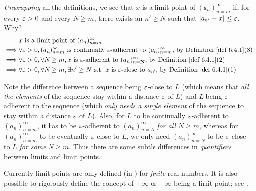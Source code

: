 \begin{additional corollary} \label{ac 6.4.1}
\emph{Unwrapping} all the definitions, we see that \(x\) is a limit point of \((a_n)_{n = m}^{\infty}\) if, for every \(\varepsilon > 0\) and every \(N \ge m\), there exists an \(n' \ge N\) such that \(\lvert a_{n'} - x\rvert \le \varepsilon\).
Why?
\begin{align*}
             & x \text{ is a limit point of } (a_n)_{n = m}^{\infty} \\
    \implies & \forall \varE > 0, (a_n)_{n = m}^{\infty} \text{ is continually } \varE \text{-adherent to } (a_n)_{n = m}^{\infty} \text{, by \DEF{6.4.1}(3)} \\
    \implies & \forall \varE > 0, \forall N \ge m, x \text{ is \(\varE\)-adherent to } (a_n)_{n = \textbf{N}}^{\infty} \text{, by \DEF{6.4.1}(2)} \\
    \implies & \forall \varE > 0, \forall N \ge m, \exists n' \ge N \text{ s.t. } x \text{ is \(\varE\)-close to \(a_{n'}\), by \DEF{6.4.1}(1)}
\end{align*}
\end{additional corollary}

\begin{note}
Note the difference between a sequence being \(\varepsilon\)-close to \(L\) (which means that \emph{all the elements} of the sequence stay within a distance \(\varepsilon\) of \(L\))
and \(L\) being \(\varepsilon\)-adherent to the sequence (which \emph{only needs a single element} of the sequence to stay within a distance \(\varepsilon\) of \(L\)).
Also, for \(L\) to be continually \(\varepsilon\)-adherent to \((a_n)_{n = m}^{\infty}\), it has to be \(\varepsilon\)-adherent to \((a_n)_{n = N}^{\infty}\) \emph{for all} \(N \ge m\),
whereas for \((a_n)_{n = m}^{\infty}\) to be eventually \(\varepsilon\)-close to \(L\), we only need \((a_n)_{n = N}^{\infty}\) to be \(\varepsilon\)-close to \(L\) \emph{for some} \(N \ge m\).
Thus there are some subtle differences in \emph{quantifiers} between limits and limit points.
\end{note}

\begin{note}
Currently limit points are only defined (in ) for \emph{finite} real numbers.
It is also possible to rigorously define the concept of \(+\infty\) or \(-\infty\) being a limit point;
see .
\end{note}

